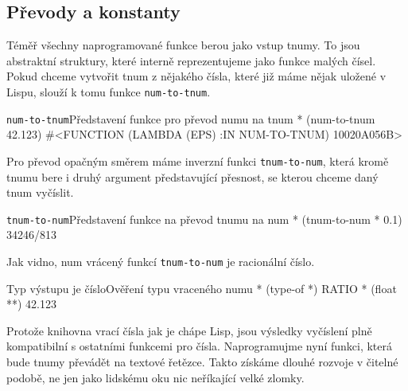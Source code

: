 \subsection{Převody a konstanty}
Téměř všechny naprogramované funkce berou jako vstup tnumy. To jsou abstraktní struktury, které interně reprezentujeme jako funkce malých čísel. Pokud chceme vytvořit tnum z nějakého čísla, které již máme nějak uložené v Lispu, slouží k tomu funkce \texttt{num-to-tnum}.

\begin{lisptest}{\texttt{num-to-tnum}}{Představení funkce pro převod numu na tnum}
* (num-to-tnum 42.123)
#<FUNCTION (LAMBDA (EPS) :IN NUM-TO-TNUM) {10020A056B}>
\end{lisptest}

Pro převod opačným směrem máme inverzní funkci \texttt{tnum-to-num}, která kro\-mě tnumu bere i druhý argument představující přesnost, se kterou chceme daný tnum vyčíslit.

\begin{lisptest}{\texttt{tnum-to-num}}{Představení funkce na převod tnumu na num}
* (tnum-to-num * 0.1)
34246/813
\end{lisptest}

Jak vidno, num vrácený funkcí \texttt{tnum-to-num} je racionální číslo.

\begin{lisptest}{Typ výstupu je číslo}{Ověření typu vraceného numu}
* (type-of *)
RATIO
* (float **)
42.123
\end{lisptest}

Protože knihovna vrací čísla jak je chápe Lisp, jsou výsledky vyčíslení plně kompatibilní s ostatními funkcemi pro čísla. Naprogramujme nyní funkci, která bude tnumy převádět na textové řetězce. Takto získáme dlouhé rozvoje v čitelné podobě, ne jen jako lidskému oku nic neříkající velké zlomky.

